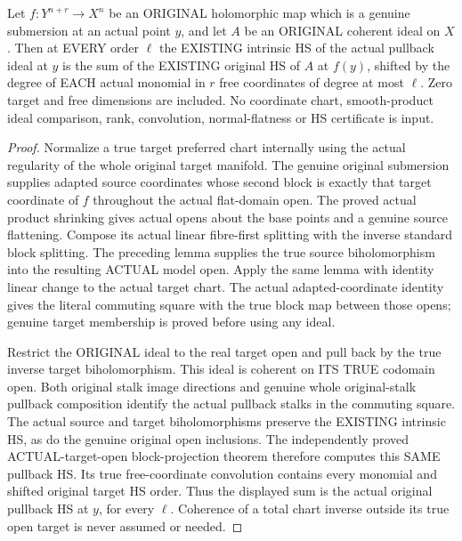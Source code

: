 \begin{theorem}
\label{hir:original-smooth-submersion-all-order-intrinsic-hs-convolution}
\leanok
Let $f:Y^{n+r}\to X^n$ be an ORIGINAL holomorphic map which is a genuine
submersion at an actual point $y$, and let $A$ be an ORIGINAL coherent
ideal on $X$. Then at EVERY order $\ell$ the EXISTING intrinsic HS of the
actual pullback ideal at $y$ is the sum of the EXISTING original HS of
$A$ at $f(y)$, shifted by the degree of EACH actual monomial in $r$ free
coordinates of degree at most $\ell$. Zero target and free dimensions
are included. No coordinate chart, smooth-product ideal comparison,
rank, convolution, normal-flatness or HS certificate is input.
\end{theorem}
\begin{proof}
Normalize a true target preferred chart internally using the actual
regularity of the whole original target manifold. The genuine original
submersion supplies adapted source coordinates whose second block is
exactly that target coordinate of $f$ throughout the actual flat-domain
open. The proved actual product shrinking gives actual opens about the
base points and a genuine source flattening. Compose its actual linear
fibre-first splitting with the inverse standard block splitting. The
preceding lemma supplies the true source biholomorphism into the
resulting ACTUAL model open. Apply the same lemma with identity linear
change to the actual target chart. The actual adapted-coordinate
identity gives the literal commuting square with the true block map
between those opens; genuine target membership is proved before using
any ideal.

Restrict the ORIGINAL ideal to the real target open and pull back by the
true inverse target biholomorphism. This ideal is coherent on ITS TRUE
codomain open. Both original stalk image directions and genuine whole
original-stalk pullback composition identify the actual pullback stalks
in the commuting square. The actual source and target biholomorphisms preserve the
EXISTING intrinsic HS, as do the genuine original open inclusions.
The independently proved ACTUAL-target-open block-projection theorem
therefore computes this SAME pullback HS. Its true free-coordinate
convolution contains every monomial and shifted original target HS
order. Thus the displayed sum is the actual original pullback HS at
$y$, for every $\ell$. Coherence of a total chart inverse outside its
true open target is never assumed or needed.
\end{proof}

